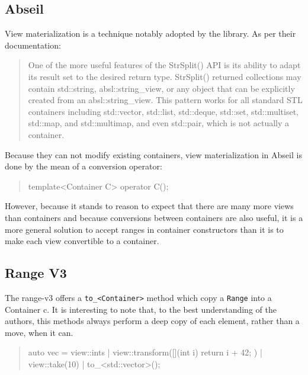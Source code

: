 \documentclass{wg21}
\newcommand{\cc}[1]{\texttt{#1}}
\begin{document}
\subsection{Abseil}

View materialization is a technique notably adopted by the \cite{Abseil} library. As per their documentation:

\begin{quote}
    One of the more useful features of the StrSplit() API is its ability to adapt its result set to the desired return type.
    StrSplit() returned collections may contain std::string, absl::string_view, or any object that can be explicitly created from an absl::string_view.
    This pattern works for all standard STL containers including std::vector,
    std::list, std::deque, std::set, std::multiset, std::map, and std::multimap, and even std::pair, which is not actually a container.
\end{quote}

Because they can not modify existing containers, view materialization in Abseil is done by the mean of a conversion operator:

\begin{quote}
\begin{codeblock}
template<Container C>
operator C();
\end{codeblock}
\end{quote}

However, because it stands to reason to expect that there are many more views than containers and because conversions between containers are also useful,
it is a more general solution to accept ranges in container constructors than it is to make each view convertible to a container.


\subsection{Range V3}

The range-v3 offers a  \cc{to_<Container>} method which copy a \cc{Range} into a Container c.
It is interesting to note that, to the best understanding of the authors, this methods always
perform a deep copy of each element, rather than a move, when it can.

\begin{quote}
\begin{codeblock}
auto vec = view::ints
	| view::transform([](int i) {
		return i + 42;
	})
	| view::take(10)
	| to_<std::vector>();
\end{codeblock}
\end{quote}
\end{document}
